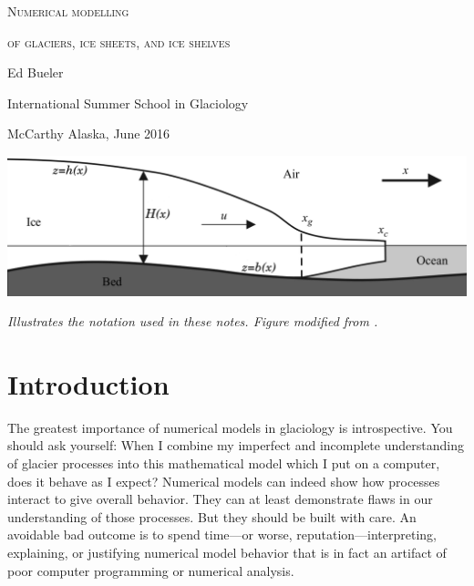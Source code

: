 \documentclass[letterpaper,final,12pt,reqno]{amsart}
\begin{document}
\graphicspath{{../figures/}}

\begin{titlepage}

  \begin{center}
  \phantom{foo}
    \vspace{1.0cm}

     {\Large \textsc{Numerical modelling}}
    \vspace{0.7cm}

     {\Large \textsc{of glaciers, ice sheets, and ice shelves}}

    \vspace{1.5cm}

    {\large Ed Bueler}
    \vspace{1cm}

    International Summer School in Glaciology

    McCarthy Alaska, June 2016

    \vfill
    
    \includegraphics[width=6.0in]{flowline}
  
    \scriptsize \emph{Illustrates the notation used in these notes.  Figure modified from \cite{SchoofMarine1}.} \normalsize
    
    \vspace{1.5in}
  \end{center}
\end{titlepage}

\clearpage\newpage

\section{Introduction}  \label{sec:intro}

The greatest importance of numerical models in glaciology is introspective.  You should ask yourself: When I combine my imperfect and incomplete understanding of glacier processes into this mathematical model which I put on a computer, does it behave as I expect?  Numerical models can indeed show how processes interact to give overall behavior.  They can at least demonstrate flaws in our understanding of those processes.  But they should be built with care.  An avoidable bad outcome is to spend time---or worse, reputation---interpreting, explaining, or justifying numerical model behavior that is in fact an artifact of poor computer programming or numerical analysis.
\end{document}
